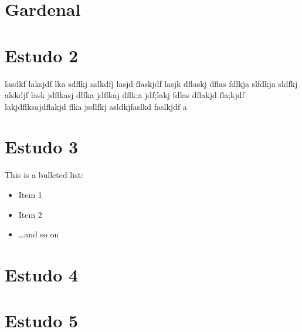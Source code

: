 \section{Gardenal}
\lipsum[1]

\section{Estudo 2} %
lasdkf laksjdf lka sdflkj aslkdfj lasjd flaskjdf lasjk dflaskj dflas fdlkja slfdkja sldfkj alskdjf lask jdflkasj dlfka jdflkaj dflk;a jdf;lakj fdlas dflakjd fla;kjdf lakjdflksajdflakjd flka jsdlfkj asldkjfaslkd faslkjdf a

\section{Estudo 3}
\lipsum[3-5]

This is a bulleted list:

\begin{itemize}
\item Item 1
\item Item 2
\item \ldots and so on
\end{itemize}

\section{Estudo 4}

\lipsum[6]

\section{Estudo 5}

\lipsum[7]
